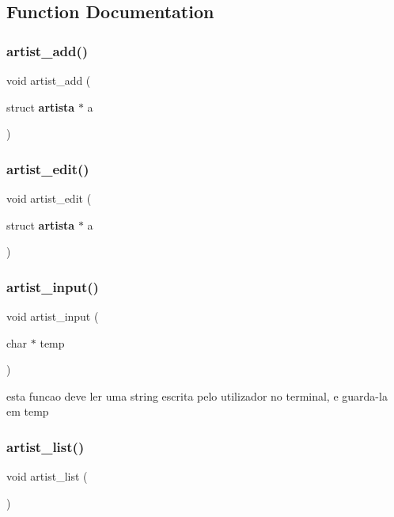 \subsection{Function Documentation}
\mbox{\label{menu__artist_8c_aa0cc094bdfe1f29db5fe4c4405b2ddde}} 
\subsubsection{artist\_add()}
{\footnotesize\ttfamily void artist\+\_\+add (\begin{DoxyParamCaption}\item[{struct \textbf{ artista} $\ast$}]{a }\end{DoxyParamCaption})}

\mbox{\label{menu__artist_8c_ab41a14f04e6032035587c9c22e60271a}} 
\subsubsection{artist\_edit()}
{\footnotesize\ttfamily void artist\+\_\+edit (\begin{DoxyParamCaption}\item[{struct \textbf{ artista} $\ast$}]{a }\end{DoxyParamCaption})}

\mbox{\label{menu__artist_8c_a30a0e556624bca6a1523351a151cf84c}} 
\subsubsection{artist\_input()}
{\footnotesize\ttfamily void artist\+\_\+input (\begin{DoxyParamCaption}\item[{char $\ast$}]{temp }\end{DoxyParamCaption})}

esta funcao deve ler uma string escrita pelo utilizador no terminal, e guarda-\/la em temp \mbox{\label{menu__artist_8c_a8f711ef177fff9555d0d9b7dbd02fe0e}} 
\subsubsection{artist\_list()}
{\footnotesize\ttfamily void artist\+\_\+list (\begin{DoxyParamCaption}{ }\end{DoxyParamCaption})}

